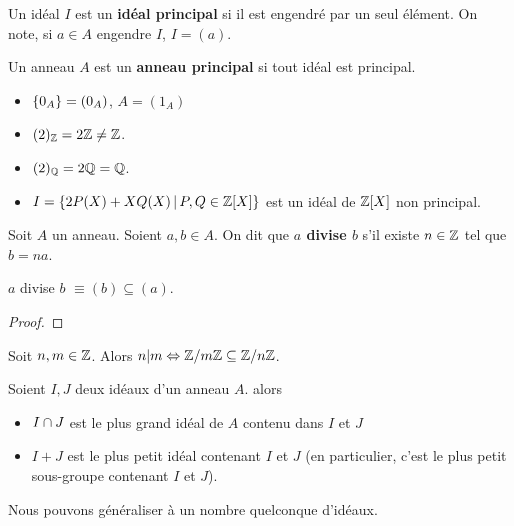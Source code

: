 \begin{definition} 
	\label{def:principal_ideal}
	Un idéal $I$ est un \textbf{idéal principal} si il est engendré par un seul
	élément. On note, si $a \in A$ engendre $I$, $I = (a)$.
\end{definition}

\begin{definition} 
	Un anneau $A$ est un \textbf{anneau principal} si tout idéal est principal.
	\label{principal_ring}
\end{definition}

\begin{exemple}
	\begin{itemize}
		\item $\left\{ 0_{A} \right\} = (0_{A})$, $A = (1_{A})$
		\item $(2)_{\mathbb{Z}} = 2\mathbb{Z} \neq \mathbb{Z}$.
		\item $(2)_{\mathbb{Q}} = 2\mathbb{Q} = \mathbb{Q}$.
		\item $I = \left\{2 P(X) + X Q(X) \, | \, P, Q \in \mathbb{Z}[X] \right\}$ est un
			idéal de $\mathbb{Z}[X]$ non principal.
	\end{itemize}
\end{exemple}

\begin{definition}
	Soit $A$ un anneau. Soient $a, b \in A$. On dit que \textbf{$a$ divise $b$}
	s'il existe $n \in \mathbb{Z}$ tel que $b = na$.
\end{definition}

\begin{proposition}
	$a$ divise $b$ $\equiv (b) \subseteq (a)$.
\end{proposition}

\ifdefined\outputproof
\begin{proof}

\end{proof}
\fi

\begin{exemple}
	Soit $n, m \in \mathbb{Z}$. Alors $n | m \Leftrightarrow \mathbb{Z}/m\mathbb{Z} \subseteq
	\mathbb{Z}/n\mathbb{Z}$.
\end{exemple}

\begin{proposition}
	Soient $I, J$ deux idéaux d'un anneau $A$. alors

	\begin{itemize}
		\item $I \cap J$ est le plus grand idéal de $A$ contenu dans $I$ et $J$
		\item $I + J$ est le plus petit idéal contenant $I$ et $J$ (en
			particulier, c'est le plus petit sous-groupe contenant $I$ et $J$).
	\end{itemize}
	Nous pouvons généraliser à un nombre quelconque d'idéaux.
\end{proposition}

